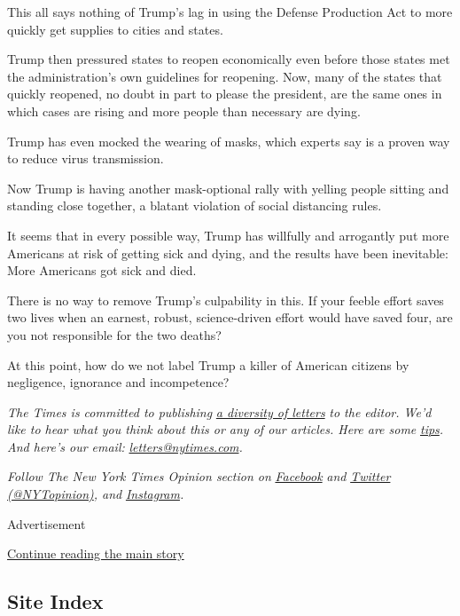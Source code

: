 This all says nothing of Trump's lag in using the Defense Production Act
to more quickly get supplies to cities and states.

Trump then pressured states to reopen economically even before those
states met the administration's own guidelines for reopening. Now, many
of the states that quickly reopened, no doubt in part to please the
president, are the same ones in which cases are rising and more people
than necessary are dying.

Trump has even mocked the wearing of masks, which experts say is a
proven way to reduce virus transmission.

Now Trump is having another mask-optional rally with yelling people
sitting and standing close together, a blatant violation of social
distancing rules.

It seems that in every possible way, Trump has willfully and arrogantly
put more Americans at risk of getting sick and dying, and the results
have been inevitable: More Americans got sick and died.

There is no way to remove Trump's culpability in this. If your feeble
effort saves two lives when an earnest, robust, science-driven effort
would have saved four, are you not responsible for the two deaths?

At this point, how do we not label Trump a killer of American citizens
by negligence, ignorance and incompetence?

\emph{The Times is committed to publishing}
\href{https://www.nytimes.com/2019/01/31/opinion/letters/letters-to-editor-new-york-times-women.html}{\emph{a
diversity of letters}} \emph{to the editor. We'd like to hear what you
think about this or any of our articles. Here are some}
\href{https://help.nytimes.com/hc/en-us/articles/115014925288-How-to-submit-a-letter-to-the-editor}{\emph{tips}}\emph{.
And here's our email:}
\href{mailto:letters@nytimes.com}{\emph{letters@nytimes.com}}\emph{.}

\emph{Follow The New York Times Opinion section on}
\href{https://www.facebook.com/nytopinion}{\emph{Facebook}} \emph{and}
\href{http://twitter.com/NYTOpinion}{\emph{Twitter
(@NYTopinion)}}\emph{, and}
\href{https://www.instagram.com/nytopinion/}{\emph{Instagram}}\emph{.}

Advertisement

\protect\hyperlink{after-bottom}{Continue reading the main story}

\hypertarget{site-index}{%
\subsection{Site Index}\label{site-index}}

